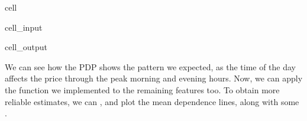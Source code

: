 \documentclass[letterpaper,10pt,english]{jupyterBook}
\begin{document}
\begin{sphinxuseclass}{cell}
\begin{sphinxVerbatimInput}
\begin{sphinxuseclass}{cell_input}
\end{sphinxuseclass}\end{sphinxVerbatimInput}
\begin{sphinxVerbatimOutput}

\begin{sphinxuseclass}{cell_output}
\noindent{}

\end{sphinxuseclass}\end{sphinxVerbatimOutput}

\end{sphinxuseclass}
\sphinxAtStartPar
We can see how the PDP shows the pattern we expected, as the time of the day affects the price through the peak morning and evening hours. Now, we can apply the function we implemented to the remaining features too. To obtain more reliable estimates, we can , and plot the mean dependence lines, along with some .
\end{document}
